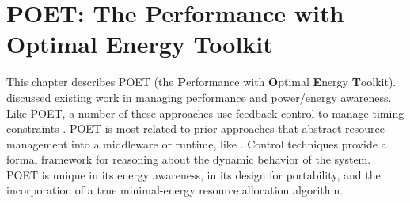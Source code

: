\chapter{POET: The Performance with Optimal Energy Toolkit}
\label{sec:poet}

This chapter describes POET (the \textbf{P}erformance with \textbf{O}ptimal \textbf{E}nergy \textbf{T}oolkit).
 discussed existing work in managing performance and power/energy awareness.
Like POET, a number of these approaches use feedback control to manage timing constraints \cite{Agilos,Bertini2007,grace2,CoAdapt,Maggio13,TCST,ControlWare,PTRADE,Fu2012,Li2007}.
POET is most related to prior approaches that abstract resource management into a middleware or runtime, like \cite{ControlWare,Sojka,PTRADE,Rajkumar}.
Control techniques provide a formal framework for reasoning about the dynamic behavior of the system.
POET is unique in its energy awareness, in its design for portability, and the incorporation of a true minimal-energy resource allocation algorithm.









